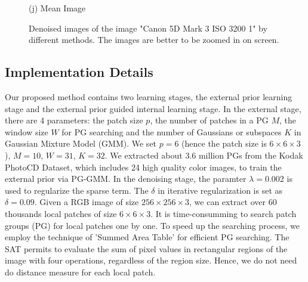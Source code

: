 \documentclass[10pt,twocolumn,letterpaper]{article}
\begin{document}
\begin{figure}
{\begin{minipage}[t]{0.195\textwidth}
{\footnotesize (j) Mean Image \cite{crosschannel2016}}
\end{minipage}
}
\caption{Denoised images of the image "Canon 5D Mark 3 ISO 3200 1" by different methods. The images are better to be zoomed in on screen.}
\label{fig5}
\end{figure}

\subsection{Implementation Details}
Our proposed method contains two learning stages, the external prior learning stage and the external prior guided internal learning stage. In the external stage, there are 4 parameters: the patch size $p$, the number of patches in a PG $M$, the window size $W$ for PG searching and the number of Gaussians or subspaces $K$ in Gaussian Mixture Model (GMM). We set $p = 6$ (hence the patch size is $6\times 6 \times 3$), $M=10$, $W = 31$, $K=32$. We extracted about 3.6 million PGs from the Kodak PhotoCD Dataset, which includes 24 high quality color images, to train the external prior via PG-GMM. In the denoising stage, the paramter $\lambda = 0.002$ is used to regularize the sparse term. The $\delta$ in iterative regularization is set as $\delta = 0.09$. Given a RGB image of size $256\times256\times3$, we can extract over 60 thousands local patches of size $6\times6\times3$. It is time-consumming to search patch groups (PG) for local patches one by one. To speed up the searching process, we employ the technique of 'Summed Area Table' \cite{sat} for efficient PG searching. The SAT permits to evaluate the sum of pixel values in rectangular regions of the image with four operations, regardless of the region size. Hence, we do not need do distance measure for each local patch.
\end{document}
